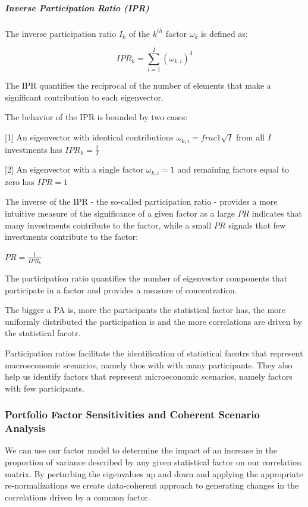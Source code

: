 \documentclass[]{article}
\begin{document}
\subparagraph{Inverse Participation Ratio
(IPR)}\label{inverse-participation-ratio-ipr}

The inverse participation ratio \(I_{k}\) of the \(k^{th}\) factor
\(\omega_{k}\) is defined as:

\[IPR_{k}=\sum_{i=1}^{I}\left( \omega_{k,i}\right)^{4}\]

The IPR quantifies the reciprocal of the number of elements that make a
significant contribution to each eigenvector.

The behavior of the IPR is bounded by two cases:

{[}1{]} An eigenvector with identical contributions
\(\omega_{k,i}=frac{1}{\sqrt{I}}\) from all \(I\) investments has
\(IPR_{k}=\frac{1}{I}\)

{[}2{]} An eigenvector with a single factor \(\omega_{k,i}=1\) and
remaining factors equal to zero has \(IPR=1\)

The inverse of the IPR - the so-called participation ratio - provides a
more intuitive measure of the significance of a given factor as a large
\(PR\) indicates that many investments contribute to the factor, while a
small \(PR\) signals that few investments contribute to the factor:

\(PR = \frac{1}{IPR_{k}}\)

The participation ratio quantifies the number of eigenvector components
that participate in a factor and provides a measure of concentration.

The bigger a PA is, more the participants the statistical factor has,
the more uniformly distributed the participation is and the more
correlations are driven by the statistical facotr.

Participation ratios facilitate the identification of statistical
facotrs that represent macroeconomic scenarios, namely thos with with
many participants. They also help us identify factors that represent
microeconomic scenarios, namely factors with few participants.

\subsubsection{Portfolio Factor Sensitivities and Coherent Scenario
Analysis}\label{portfolio-factor-sensitivities-and-coherent-scenario-analysis}

We can use our factor model to determine the impact of an increase in
the proportion of variance described by any given statistical factor on
our correlation matrix. By perturbing the eigenvalues up and down and
applying the appropriate re-normalizations we create data-coherent
approach to generating changes in the correlations driven by a common
factor.
\end{document}
